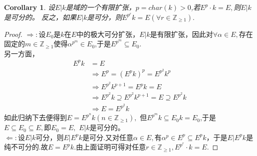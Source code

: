 \documentclass[UTF8]{article}
\newtheorem{cor}{Corollary}[section]
\begin{document}
\begin{cor}
设$E|k$是域的一个有限扩张，$p=char(k)>0$,若$E^{p}\cdot k=E,$则$E|k$是可分的。
反之，如果$E|k$是可分，则$E^{p^{r}}k=E(\forall r\in \mathbb{Z}_{\geq 1}).$
\end{cor}
\begin{proof}
	
	$\Rightarrow:$设$E_{0}$是$k$在$E$中的极大可分扩张，$E|k$是有限扩张，因此对$\forall \alpha \in E,$存在固定的$m\in \mathbb{Z}_{\geq 1}$使得$\alpha^{p^{m}}\in E_{0}$,于是$E^{p^{m}}\subseteq E_{0}.$\\
	
	另一方面，
	\[
	\begin{split}
	E^{p}k&=E\\
	&\Rightarrow E^{p}=(E^{p}k)^{p}=E^{p^{2}}k^{p}\\
	&\Rightarrow E^{p^{2}}k^{p+1}=E^{p}k=E\\
	&\Rightarrow E^{p^{2}}k\supseteq E^{p^{2}}k^{p+1}=E\supseteq E^{p^{2}}k\\
	&\Rightarrow E=E^{p^{2}}k
	\end{split}
	\]
	如此归纳下去便得到$E=E^{p^{n}}k(n\in \mathbb{Z}_{\geq 1}),$
	但$E^{p^{m}}k\subseteq E_{0}k=E_{0}$,于是$E\subseteq E_{0}\subseteq E,$即$E_{0}=E,$ $E|k$是可分的。\\
	$\Leftarrow:$设$E|k$可分，则$E|E^{p}k$是可分.又对任意$\alpha\in E,$有$\alpha^{p}\in E^{p}\subseteq E^{p}k$，于是$E|E^{p}k$是纯不可分的.故$E=E^{p}k.$由上面证明可得对任意$r\in \mathbb{Z}_{\geq 1},E^{p^{r}}\cdot k=E.$
\end{proof}
\end{document}
